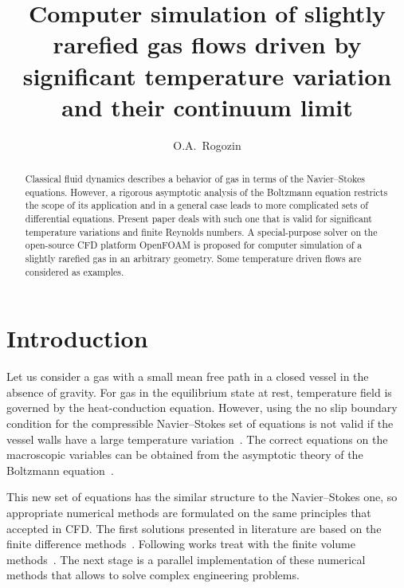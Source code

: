 \documentclass[smallextended, referee]{svjour3} %
\begin{document}
\title{
	Computer simulation of slightly rarefied gas flows driven by significant temperature variation and their continuum limit
}

\author{O.A.~Rogozin}

\maketitle

\begin{abstract}
	Classical fluid dynamics describes a behavior of gas in terms of the
	Navier--Stokes equations. However, a rigorous asymptotic analysis of
	the Boltzmann equation restricts the scope of its application and in
	a general case leads to more complicated sets of differential
	equations. Present paper deals with such one that is valid for
	significant temperature variations and finite Reynolds numbers. A
	special-purpose solver on the open-source CFD platform
	OpenFOAM\textregistered{} is proposed for computer simulation of a
	slightly rarefied gas in an arbitrary geometry. Some temperature
	driven flows are considered as examples.
\end{abstract}

\section{Introduction}

Let us consider a gas with a small mean free path in a closed vessel in the absence of gravity.
For gas in the equilibrium state at rest, temperature field is governed by the heat-conduction equation.
However, using the no slip boundary condition for the compressible Navier--Stokes set of equations
is not valid if the vessel walls have a large temperature variation~\cite{Kogan1976, GhostEffect}.
The correct equations on the macroscopic variables can be obtained from the asymptotic theory of
the Boltzmann equation~\cite{Sone2002, Sone2007}.

This new set of equations has the similar structure to the Navier--Stokes one,
so appropriate numerical methods are formulated on the same principles that accepted in CFD.
The first solutions presented in literature are based on the finite difference methods~\cite{GhostEffect, SoneCoaxial}.
Following works treat with the finite volume methods~\cite{Laneryd2006, Laneryd2007}.
The next stage is a parallel implementation of these numerical methods that allows
to solve complex engineering problems.
\end{document}
